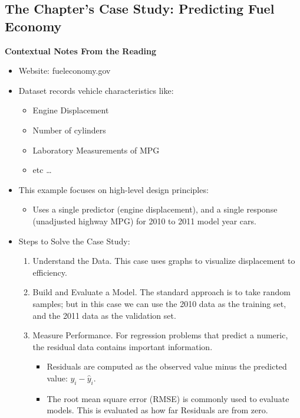 \documentclass[../main.tex]{subfiles}
\begin{document}
\subsection{The Chapter's Case Study: Predicting Fuel Economy}

    \textbf{Contextual Notes From the Reading}
    \begin{itemize}
        \item Website: fueleconomy.gov
        \item Dataset records vehicle characteristics like:
        \begin{itemize}
            \item Engine Displacement
            \item Number of cylinders
            \item Laboratory Measurements of MPG
            \item etc \dots
        \end{itemize}
        \item This example focuses on high-level design principles:
        \begin{itemize}
            \item Uses a single predictor (engine displacement), and a single response 
            (unadjusted highway MPG) for 2010 to 2011 model year cars.
        \end{itemize}
        \item Steps to Solve the Case Study:
        \begin{enumerate}
            \item Understand the Data. This case uses graphs to visualize displacement to efficiency.
            \item Build and Evaluate a Model. The standard approach is to take random samples;
            but in this case we can use the 2010 data as the training set, and the 2011 data as the validation set.
            \item Measure Performance. For regression problems that predict a numeric, the residual data contains important information.
            \begin{itemize}
                \item Residuals are computed as the observed value minus the predicted value: $ y_i - \hat{y}_i $. 
                \item The root mean square error (RMSE) is commonly used to evaluate models. This is evaluated as how far Residuals are from zero.
            \end{itemize}

\end{enumerate}
\end{itemize}
\end{document}
